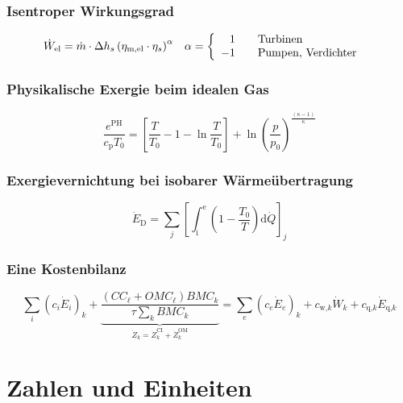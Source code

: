 \subsubsection{Isentroper Wirkungsgrad}
\begin{align}
\dot W_\text{el} &= \dot m \cdot \Delta h_s \left(\eta_\text{m,el} \cdot \eta_s\right)^\alpha &
\alpha &= \left\{
\begin{array}{r l}
1 & \quad \text{Turbinen}\\
-1 & \quad \text{Pumpen, Verdichter}
\end{array}
\right.
\end{align}

\subsubsection{Physikalische Exergie beim  idealen Gas}
\begin{equation}
\frac{e^\text{PH}}{c_\text{p}T_0}=\left[\frac{T}{T_0}-1-\ln\frac{T}{T_0}\right]+\ln\left(\frac{p}{p_0}\right)^{\frac{\left(\kappa-1\right)}{\kappa}}
\end{equation}

\subsubsection{Exergievernichtung bei isobarer Wärmeübertragung}
\begin{equation}
\dot E_\text{D}=\sum\limits_j\left[\int_\text{i}^\text{e}\left(1-\frac{T_0}{T}\right)\text{d}\dot Q\right]_j	
\label{eq:ed_he}
\end{equation}

\subsubsection{Eine Kostenbilanz}
\begin{equation}
\sum_i{\left(c_i\dot E_i\right)_k} + \underbrace{\frac{\left(CC_\ell+OMC_\ell\right) BMC_k}{\tau \sum_k{BMC_k}}}_{\dot Z_k=\dot Z_k^\text{CI}+\dot Z_k^\text{OM}}
=\sum_e{\left(c_e\dot E_e\right)_k} + c_{\text{w,}k} \dot W_k + c_{\text{q,}k}\dot E_{\text{q,}k}
\label{eq:cost_balance}
\end{equation}

\section{Zahlen und Einheiten}
\label{sec:zahlen-einheiten}

